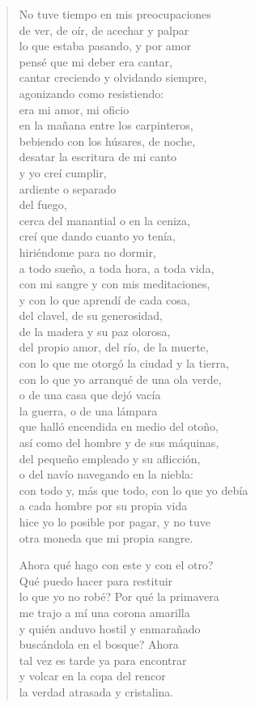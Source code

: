 \documentclass[12pt]{article}
\begin{document}
\begin{verse}
No tuve tiempo en mis preocupaciones\\
de ver, de oír, de acechar y palpar\\
lo que estaba pasando, y por amor\\
pensé que mi deber era cantar,\\
cantar creciendo y olvidando siempre,\\
agonizando como resistiendo:\\
era mi amor, mi oficio\\
en la mañana entre los carpinteros,\\
bebiendo con los húsares, de noche,\\
desatar la escritura de mi canto\\
y yo creí cumplir,\\
ardiente o separado\\
del fuego,\\
cerca del manantial o en la ceniza,\\
creí que dando cuanto yo tenía,\\
hiriéndome para no dormir,\\
a todo sueño, a toda hora, a toda vida,\\
con mi sangre y con mis meditaciones,\\
y con lo que aprendí de cada cosa,\\
del clavel, de su generosidad,\\
de la madera y su paz olorosa,\\
del propio amor, del río, de la muerte,\\
con lo que me otorgó la ciudad y la tierra,\\
con lo que yo arranqué de una ola verde,\\
o de una casa que dejó vacía\\
la guerra, o de una lámpara\\
que halló encendida en medio del otoño,\\
así como del hombre y de sus máquinas,\\
del pequeño empleado y su aflicción,\\
o del navío navegando en la niebla:\\
con todo y, más que todo, con lo que yo debía\\
a cada hombre por su propia vida\\
hice yo lo posible por pagar, y no tuve\\
otra moneda que mi propia sangre.  

Ahora qué hago con este y con el otro?\\
Qué puedo hacer para restituir\\
lo que yo no robé? Por qué la primavera\\
me trajo a mí una corona amarilla\\
y quién anduvo hostil y enmarañado\\
buscándola en el bosque? Ahora\\
tal vez es tarde ya para encontrar\\
y volcar en la copa del rencor\\
la verdad atrasada y cristalina.  


\end{verse}
\end{document}

